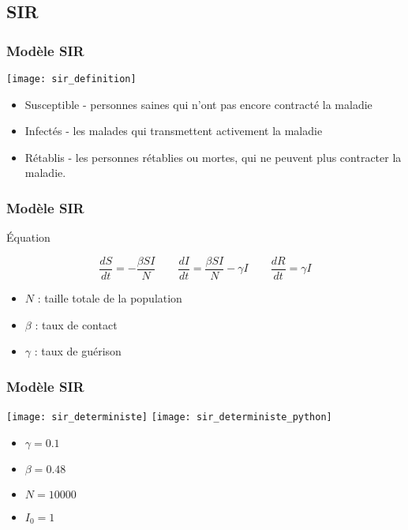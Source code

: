 \subsection{SIR}

\begin{frame}
        \frametitle{Modèle SIR}

        \begin{center}
                \texttt{[image: sir\_definition]}
        \end{center}


        \begin{itemize}
                \item Susceptible - personnes saines qui n'ont pas encore contracté la maladie
                \item Infectés - les malades qui transmettent activement la maladie
                \item Rétablis - les personnes rétablies ou mortes, qui ne peuvent plus contracter la maladie.
        \end{itemize}


\end{frame}

\begin{frame}
        \frametitle{Modèle SIR}

        \begin{alertblock}{Équation}

                $$ \frac{dS}{dt} = -\frac{\beta SI}{N} \qquad \frac{dI}{dt} = \frac{\beta SI}{N} - \gamma I \qquad \frac{dR}{dt} = \gamma I $$

                \begin{itemize}
                        \item $N$ : taille totale de la population
                        \item $\beta$ : taux de contact
                        \item $\gamma$ : taux de guérison
                \end{itemize}

        \end{alertblock}
\end{frame}

\begin{frame}
        \frametitle{Modèle SIR}
			
		\texttt{[image: sir\_deterministe]}
		\texttt{[image: sir\_deterministe\_python]}
		
        \begin{multicols}{2}
                \begin{itemize}
                        \item $\gamma = 0.1$
                        \item $\beta = 0.48$
                        \item $N = 10000$
                        \item $I_0 = 1$
                \end{itemize}
        \end{multicols}

\end{frame}

